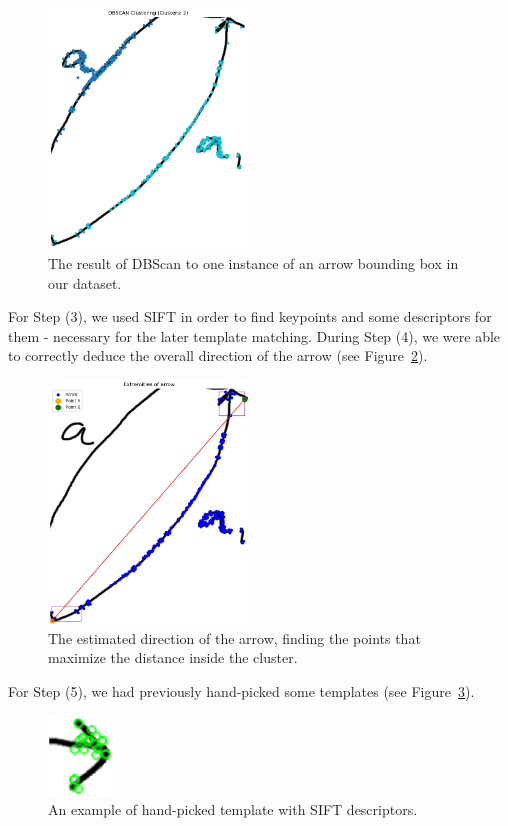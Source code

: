 \documentclass[conference]{IEEEtran}
\begin{document}
\begin{appendices}
\begin{figure}[H]
	\centering
	\includegraphics[width=150pt]{arrow_double_clustering_clusters.png}
	\caption{The result of DBScan to one instance of an arrow bounding box in our dataset.}
	\label{fig:arrow_double_clustering_clusters}
\end{figure}

For Step (3), we used SIFT \cite{SIFT} in order to find keypoints and some descriptors for them - necessary for the later template matching.
During Step (4), we were able to correctly deduce the overall direction of the arrow (see Figure~\ref{fig:arrow_double_clustering_direction}).

\begin{figure}[H]
	\centering
	\includegraphics[width=150pt]{arrow_double_clustering_direction.png}
	\caption{The estimated direction of the arrow, finding the points that maximize the distance inside the cluster.}
	\label{fig:arrow_double_clustering_direction}
\end{figure}

For Step (5), we had previously hand-picked some templates (see Figure~\ref{fig:templates}).

\begin{figure}[H]
	\centering
	\includegraphics[width=50pt, height=60pt]{templates.png}
	\caption{An example of hand-picked template with SIFT descriptors.}
	\label{fig:templates}
\end{figure}


\end{appendices}
\end{document}
